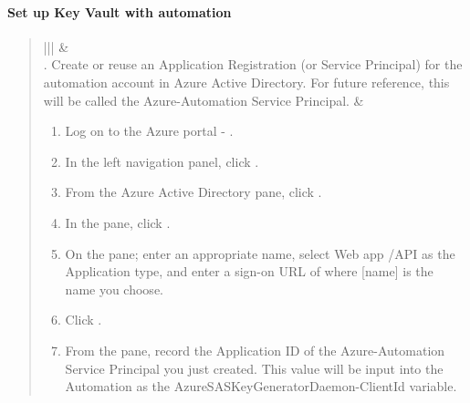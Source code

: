 \documentclass[letterpaper,10pt,english]{sphinxmanual}
\begin{document}
\paragraph{Set up Key Vault with automation}
\label{\detokenize{mcdmp_app_ug:set-up-key-vault-with-automation}}\label{\detokenize{mcdmp_app_ug:set-up-key-vault}}
\begin{quote}


\begin{savenotes}\sphinxattablestart
\centering
\begin{tabular}[t]{|*{2}{|}}
\hline
{}\relax &\relax \\
. Create or reuse an Application
Registration (or Service Principal)
for the automation account in Azure
Active Directory. For future
reference, this will be called
the Azure-Automation Service
Principal.
&\begin{enumerate}
\item {} 
Log on to the Azure portal - .

\item {} 
In the left navigation panel, click 
.

\item {} 
From the Azure Active Directory pane, click 
.

\item {} 
In the  pane, click 
.

\item {} 
On the  pane; enter an appropriate name,
select Web app /API as the Application type, and enter
a sign-on URL of  where {[}name{]} is the
name you choose.

\item {} 
Click .

\item {} 
From the  pane, record the
Application ID of the Azure-Automation Service
Principal you just created. This value will be input
into the  Automation as the
AzureSASKeyGeneratorDaemon-ClientId variable.


\end{enumerate}
\end{tabular}
\end{savenotes}
\end{quote}
\end{document}
